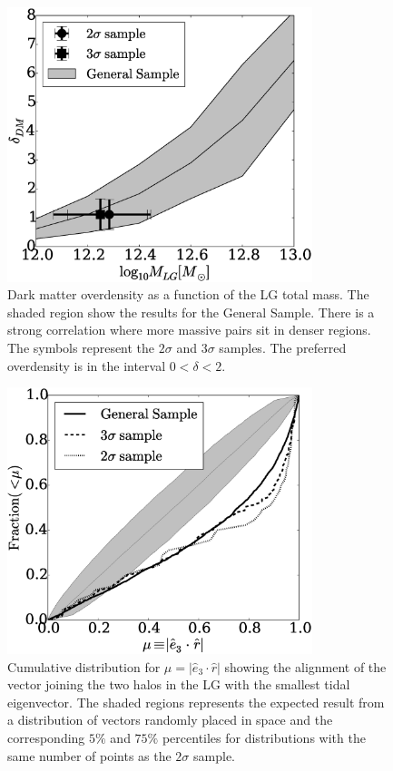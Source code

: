 \documentclass{iau}
\begin{document}
\begin{figure}[t]
\begin{center}
 \includegraphics[width=3.5in]{median_mass_overdensity.eps} 
 \caption{Dark matter overdensity as a function of the LG total
   mass. The shaded region show the results for the General
   Sample. There is a strong correlation where more massive pairs sit
   in  denser regions. The symbols represent the $2\sigma$ and
   $3\sigma$ samples. The preferred overdensity is in the interval
   $0<\delta<2$.}
   \label{fig:overdensity}
\end{center}
\end{figure}

\begin{figure}[t]
\begin{center}
 \includegraphics[width=3.5in]{alignments_e3_r_all_environments.eps} 
 \caption{Cumulative distribution for $\mu=|\hat{e}_{3}\cdot\hat{r}|$
   showing the alignment of the vector joining the two halos in the LG
 with the smallest tidal eigenvector. The shaded regions represents
 the expected result from a distribution of vectors randomly placed in
 space and the corresponding $5\%$ and $75\%$ percentiles for
 distributions with the same number of points as the $2\sigma$ sample.}
   \label{fig:alignment_r}
\end{center}
\end{figure}
\end{document}
